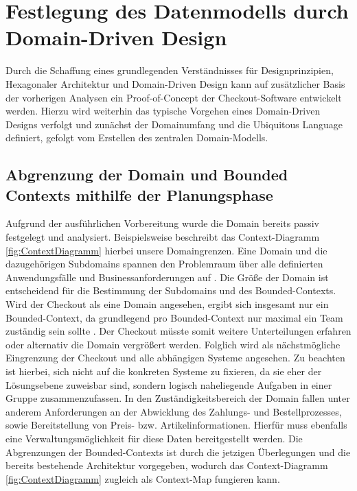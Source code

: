 

\chapter{Festlegung des Datenmodells durch Domain-Driven Design}

Durch die Schaffung eines grundlegenden Verständnisses für Designprinzipien, Hexagonaler Architektur und Domain-Driven Design kann auf zusätzlicher Basis der vorherigen Analysen ein Proof-of-Concept der Checkout-Software entwickelt werden. Hierzu wird weiterhin das typische Vorgehen eines Domain-Driven Designs verfolgt und zunächst der Domainumfang und die Ubiquitous Language definiert, gefolgt vom Erstellen des zentralen Domain-Modells.

\section{Abgrenzung der Domain und Bounded Contexts mithilfe der Planungsphase}

Aufgrund der ausführlichen Vorbereitung wurde die Domain bereits passiv festgelegt und analysiert. Beispielsweise beschreibt das Context-Diagramm \ref{fig:ContextDiagramm} hierbei unsere Domaingrenzen. Eine Domain und die dazugehörigen Subdomains spannen den Problemraum über alle definierten Anwendungsfälle und Businessanforderungen auf \cite[S. 56]{Vernon.2015}. Die Größe der Domain ist entscheidend für die Bestimmung der Subdomains und des Bounded-Contexts. Wird der Checkout als eine Domain angesehen, ergibt sich insgesamt nur ein Bounded-Context, da grundlegend pro Bounded-Context nur maximal ein Team zuständig sein sollte \cite{Brandolini.2021}. Der Checkout müsste somit weitere Unterteilungen erfahren oder alternativ die Domain vergrößert werden. Folglich wird als nächstmögliche Eingrenzung der Checkout und alle abhängigen Systeme angesehen. Zu beachten ist hierbei, sich nicht auf die konkreten Systeme zu fixieren, da sie eher der Lösungsebene zuweisbar sind, sondern logisch naheliegende Aufgaben in einer Gruppe zusammenzufassen. In den Zuständigkeitsbereich der Domain fallen unter anderem Anforderungen an der Abwicklung des Zahlungs- und Bestellprozesses, sowie Bereitstellung von Preis- bzw. Artikelinformationen. Hierfür muss ebenfalls eine Verwaltungsmöglichkeit für diese Daten bereitgestellt werden. Die Abgrenzungen der Bounded-Contexts ist durch die jetzigen Überlegungen und die bereits bestehende Architektur vorgegeben, wodurch das Context-Diagramm \ref{fig:ContextDiagramm} zugleich als Context-Map fungieren kann.


